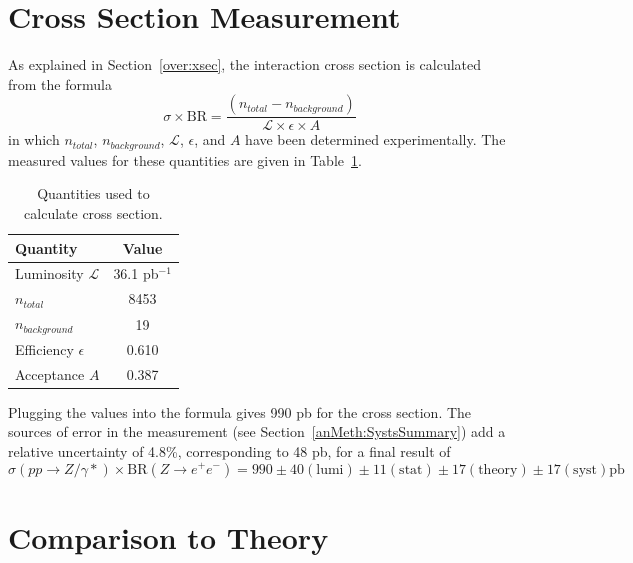 


\section{Cross Section Measurement}
\label{res:xsec}

As explained in Section~\ref{over:xsec}, 
the interaction cross section is calculated from the formula 
\[
\sigma \times \mathrm{BR} 
= \frac{\left( n_{total} - n_{background }\right)}{\mathcal{ L } \times \epsilon \times A }
\]
in which $n_{total}$, $n_{background}$, $\mathcal{ L }$, $\epsilon$, and $A$  
have been 
determined 
experimentally.  
The measured values for these quantities 
are given in Table~\ref{TableXsecNumbers}. 

\begin{table}[htbp]
  \begin{center}
    \caption{\fixspacing Quantities used to calculate cross section.}
    \label{TableXsecNumbers}
    \begin{tabular}[]{ | l | c | }
      \hline
      Quantity & Value \\ \hline \hline
      Luminosity $\mathcal{L}$ & 36.1 pb$^{-1}$ \\ \hline
      $n_{total}$ & 8453 \\ \hline
      $n_{background}$ & 19 \\ \hline
      Efficiency $\epsilon$ & 0.610 \\ \hline
      Acceptance $A$ & 0.387 \\ \hline
    \end{tabular}
  \end{center}
\end{table}



Plugging the values into the formula gives 
990 pb for the cross section.  
%
The sources of error in the measurement 
(see Section~\ref{anMeth:SystsSummary}) 
add a relative uncertainty of 4.8\%, 
corresponding to 48 pb, for a final result of 
\[
\sigma(pp \rightarrow Z/\gamma *) \times \mathrm{BR}(Z \rightarrow e^+ e^- )
= 990 \pm 40 \mathrm{(lumi)} \pm 11 \mathrm{(stat)} \pm 17 \mathrm{(theory)} \pm 17 \mathrm{(syst)} \mathrm{pb} 
\]



\section{Comparison to Theory}
\label{res:theory}

